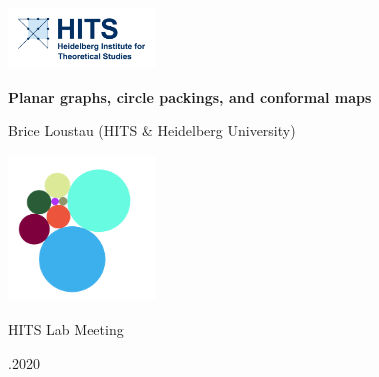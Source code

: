 \begin{frame}



\noindent \hspace{-20pt}
\includegraphics[width=110pt]{logo1.png}





\vspace{15pt}
\begin{center}
{\Large \bfseries Planar graphs, circle packings, and conformal maps}
  
\bigskip
{\large Brice Loustau (HITS \& Heidelberg University)}


\bigskip

\centering
\includegraphics[width=110pt]{CP-r.png}

\bigskip

{HITS Lab Meeting}

.2020
\end{center}
\end{frame}

